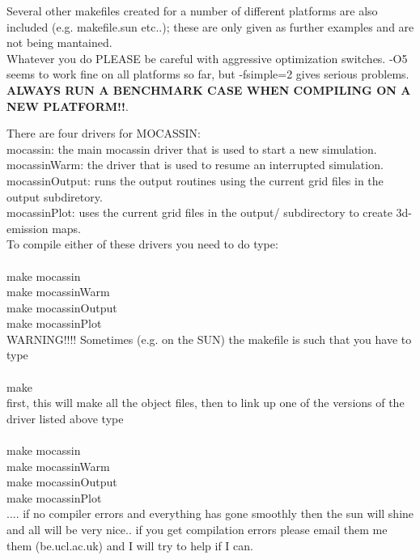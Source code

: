 \documentclass[11pt]{article}
\begin{document}
   Several other makefiles created for a number of different platforms are also included
   (e.g. makefile.sun etc..); these are only given as further examples and are not 
   being mantained.\\

   Whatever you do PLEASE be careful with aggressive optimization switches. -O5 seems to work fine on all platforms
   so far, but -fsimple=2 gives serious problems. {\bf ALWAYS RUN A BENCHMARK CASE WHEN COMPILING ON A NEW PLATFORM!!}.

   There are four drivers for MOCASSIN: \\
\indent    mocassin: the main mocassin driver that is used to start a new simulation.\\
\indent    mocassinWarm: the driver that is used to resume an interrupted simulation.\\
\indent    mocassinOutput: runs the output routines using the current grid files in the output subdiretory.\\
\indent    mocassinPlot: uses the current grid files in the output/ subdirectory to create 3d-emission maps. \\

   To compile either of these drivers you need to do type:\\
\\
\indent     make mocassin\\
\indent     make mocassinWarm\\
\indent     make mocassinOutput\\
\indent     make mocassinPlot  \\

   WARNING!!!! Sometimes (e.g. on the SUN) the makefile is such that you have to type \\
\\
\indent     make \\

\noindent   first, this will make all the object files, then to link up one of the 
   versions of the driver listed above type\\
\\
\indent     make mocassin \\
\indent     make mocassinWarm\\
\indent     make mocassinOutput\\ 
\indent     make mocassinPlot\\

\noindent   .... if no compiler errors and everything has gone smoothly then the sun will shine and 
   all will be very nice.. if you get compilation errors please email them me them 
   (be\@star.ucl.ac.uk) and I will try to help if I can.\\
\end{document}
